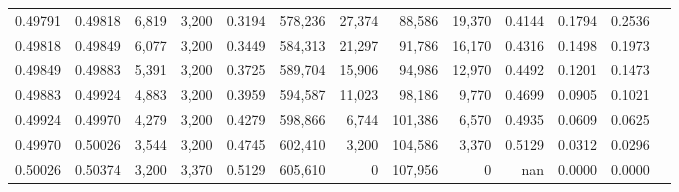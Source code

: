 \begin{tabular}{rrrrrrrrrrrrr}
0.49791 & 0.49818 &  6,819 & 3,200 &                                     0.3194 & 578,236 &  27,374 &  88,586 &  19,370 & 0.4144 & 0.1794 & 0.2536 \\
0.49818 & 0.49849 &  6,077 & 3,200 &                                     0.3449 & 584,313 &  21,297 &  91,786 &  16,170 & 0.4316 & 0.1498 & 0.1973 \\
0.49849 & 0.49883 &  5,391 & 3,200 &                                     0.3725 & 589,704 &  15,906 &  94,986 &  12,970 & 0.4492 & 0.1201 & 0.1473 \\
0.49883 & 0.49924 &  4,883 & 3,200 &                                     0.3959 & 594,587 &  11,023 &  98,186 &   9,770 & 0.4699 & 0.0905 & 0.1021 \\
0.49924 & 0.49970 &  4,279 & 3,200 &                                     0.4279 & 598,866 &   6,744 & 101,386 &   6,570 & 0.4935 & 0.0609 & 0.0625 \\
0.49970 & 0.50026 &  3,544 & 3,200 &                                     0.4745 & 602,410 &   3,200 & 104,586 &   3,370 & 0.5129 & 0.0312 & 0.0296 \\
0.50026 & 0.50374 &  3,200 & 3,370 &                                     0.5129 & 605,610 &       0 & 107,956 &       0 &    nan & 0.0000 & 0.0000 \\
\bottomrule
\end{tabular}
